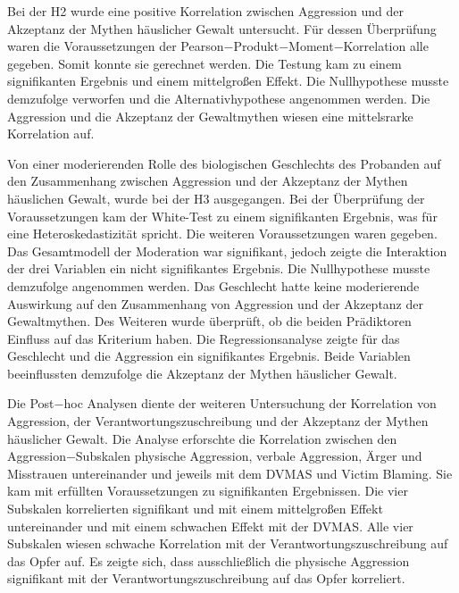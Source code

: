 Bei der H2 wurde eine positive Korrelation zwischen Aggression und der Akzeptanz der Mythen häuslicher Gewalt untersucht. Für dessen Überprüfung waren die Voraussetzungen der Pearson$-$Produkt$-$Moment$-$Korrelation alle gegeben. Somit konnte sie gerechnet werden. Die Testung kam zu einem signifikanten Ergebnis und einem mittelgroßen Effekt. Die Nullhypothese musste demzufolge verworfen und die Alternativhypothese angenommen werden. Die Aggression und die Akzeptanz der Gewaltmythen wiesen eine mittelsrarke Korrelation auf.

Von einer moderierenden Rolle des biologischen Geschlechts des Probanden auf den Zusammenhang zwischen Aggression und der Akzeptanz der Mythen häuslichen Gewalt, wurde bei der H3 ausgegangen. Bei der Überprüfung der Voraussetzungen kam der White-Test zu einem signifikanten Ergebnis, was für eine Heteroskedastizität spricht. Die weiteren Voraussetzungen waren gegeben. Das Gesamtmodell der Moderation war signifikant, jedoch zeigte die Interaktion der drei Variablen ein nicht signifikantes Ergebnis. Die Nullhypothese musste demzufolge angenommen werden. Das Geschlecht hatte keine moderierende Auswirkung auf den Zusammenhang von Aggression und der Akzeptanz der Gewaltmythen. Des Weiteren wurde überprüft, ob die beiden Prädiktoren Einfluss auf das Kriterium haben. Die Regressionsanalyse zeigte für das Geschlecht und die Aggression ein signifikantes Ergebnis. Beide Variablen beeinflussten demzufolge die Akzeptanz der Mythen häuslicher Gewalt.

Die Post$-$hoc Analysen diente der weiteren Untersuchung der Korrelation von Aggression, der Verantwortungszuschreibung und der Akzeptanz der Mythen häuslicher Gewalt. Die Analyse erforschte die Korrelation zwischen den Aggression$-$Subskalen physische Aggression, verbale Aggression, Ärger und Misstrauen untereinander und jeweils mit dem DVMAS und Victim Blaming. Sie kam mit erfüllten Voraussetzungen zu signifikanten Ergebnissen. Die vier Subskalen korrelierten signifikant und mit einem mittelgroßen Effekt untereinander und mit einem schwachen Effekt mit der DVMAS. Alle vier Subskalen wiesen schwache Korrelation mit der Verantwortungszuschreibung auf das Opfer auf. Es zeigte sich, dass ausschließlich die physische Aggression signifikant mit der Verantwortungszuschreibung auf das Opfer korreliert.


